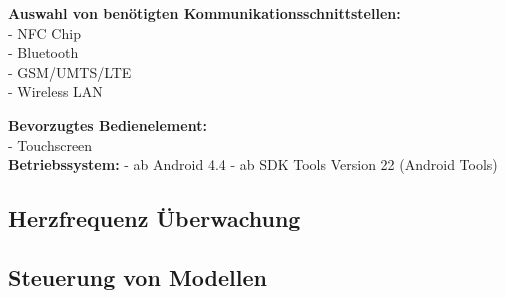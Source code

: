 \textbf{Auswahl von benötigten Kommunikationsschnittstellen:}\\
- NFC Chip\\
- Bluetooth\\
- GSM/UMTS/LTE\\
- Wireless LAN

\textbf{Bevorzugtes Bedienelement:}\\
- Touchscreen\\

\textbf{Betriebssystem:}
- ab Android 4.4
- ab SDK Tools Version 22 (Android Tools)

\subsection{Herzfrequenz Überwachung}

\subsection{Steuerung von Modellen}
\newpage
